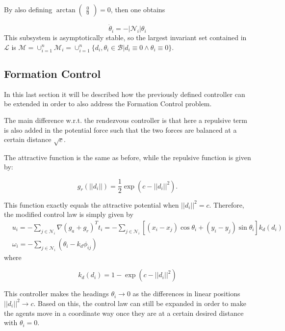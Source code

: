\documentclass[11pt]{article}
\begin{document}
By also defining $\arctan\begin{pmatrix}
\frac{0}{0}
\end{pmatrix} = 0$, then one obtains

\begin{equation}
\dot{\theta}_i = - |\mathcal{N}_i|\theta_i
\end{equation}
This subsystem is asymptotically stable, so the largest invariant set contained in $\mathcal{L}$ is $\mathcal{M} = \cup_{i = 1}^n\mathcal{M}_i = \cup_{i = 1}^n\{d_i,\theta_i \in \mathcal{B}|d_i \equiv 0 \land \theta_i \equiv 0\}$.

\subsection*{Formation Control}

In this last section it will be described how the previously defined controller can be extended in order to also address the Formation Control problem.

The main difference w.r.t. the rendezvous controller is that here a repulsive term is also added in the potential force such that the two forces are balanced at a certain distance $\sqrt{c}$.

The attractive function is the same as before, while the repulsive function is given by:

\begin{equation}
g_r(||d_i||) = \frac{1}{2}\exp(c - ||d_i||^2).
\end{equation}

This function exactly equals the attractive potential when $||d_i||^2 = c$. Therefore, the modified control law is simply given by 
\begin{align}
& u_i = -\sum_{j \in \mathcal{N}_i} \nabla (g_a + g_r)^Tt_i = -\sum_{j \in \mathcal{N}_i} [(x_i - x_j)\cos\theta_i + (y_i - y_j)\sin\theta_i]k_d(d_i)\\
& \omega_i = -\sum_{j \in \mathcal{N}_i} (\theta_i - k_d\phi_{ij})
\end{align}
where 

\begin{equation}
k_d(d_i) = 1-\exp(c-||d_i||^2)
\end{equation}

This controller makes the headings $\theta_i \rightarrow 0$ as the differences in linear positions $||d_i||^2 \rightarrow c$. Based on this, the control law can still be expanded in order to make the agents move in a coordinate way once they are at a certain desired distance with $\theta_i = 0$.
\end{document}

